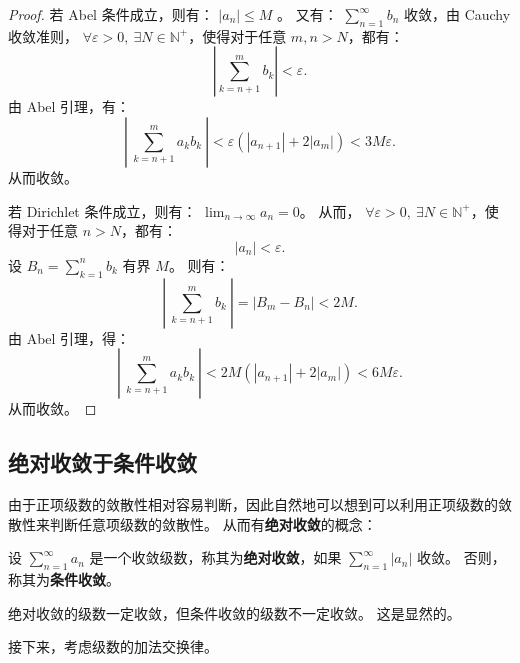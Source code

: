 \begin{proof}
  若 Abel 条件成立，则有： $|a_n| \leq M$ 。
  又有： $\sum_{n=1}^{\infty} b_n$ 收敛，由 Cauchy 收敛准则， $\forall \varepsilon > 0,\ \exists N \in \mathbb{N}^+$，使得对于任意 $m, n > N$，都有：
  \begin{equation*}
    \left| \sum_{k=n+1}^{m} b_k \right| < \varepsilon.
  \end{equation*}
  由 Abel 引理，有：
  \begin{equation*}
    \left|\ \sum_{k=n+1}^{m} a_k b_k \ \right|
    < \varepsilon \left( |a_{n+1}| + 2 |a_m| \right) 
    < 3M \varepsilon.
  \end{equation*}
  从而收敛。

  若 Dirichlet 条件成立，则有： $\lim_{n \to \infty} a_n = 0$。
  从而， $\forall \varepsilon > 0,\ \exists N \in \mathbb{N}^+$，使得对于任意 $n > N$，都有：
  \begin{equation*}
    |a_n| < \varepsilon.
  \end{equation*}
  设 $B_n = \sum_{k=1}^{n} b_k$ 有界 $M$。
  则有：
  \begin{equation*}
    \left|\ \sum_{k=n+1}^{m} b_k \ \right| 
    = \left| B_m - B_n \right|
    < 2M.
  \end{equation*}
  由 Abel 引理，得：
  \begin{equation*}
    \left|\ \sum_{k=n+1}^{m} a_k b_k \ \right|
    < 2M \left( |a_{n+1}| + 2 |a_m| \right) 
    < 6M \varepsilon.
  \end{equation*}
  从而收敛。

\end{proof}

\subsection{绝对收敛于条件收敛}\label{subsec:absolute-convergence}

由于正项级数的敛散性相对容易判断，因此自然地可以想到可以利用正项级数的敛散性来判断任意项级数的敛散性。
从而有\textbf{绝对收敛}的概念：

\begin{definition}[绝对收敛]\label{def:absolute-convergence}
  设 $\sum_{n=1}^{\infty} a_n$ 是一个收敛级数，称其为\textbf{绝对收敛}，如果 $\sum_{n=1}^{\infty} |a_n|$ 收敛。
  否则，称其为\textbf{条件收敛}。
\end{definition}

绝对收敛的级数一定收敛，但条件收敛的级数不一定收敛。
这是显然的。

接下来，考虑级数的加法交换律。
